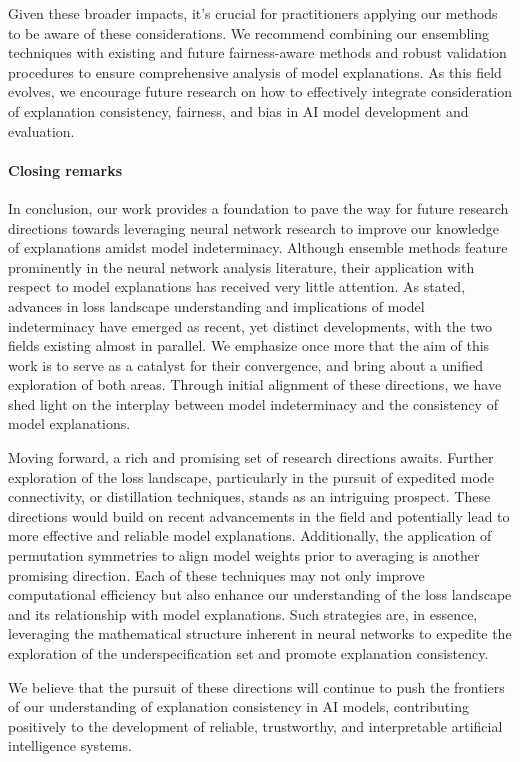 Given these broader impacts, it's crucial for practitioners applying our methods to be aware of these considerations. We recommend combining our ensembling techniques with existing and future fairness-aware methods and robust validation procedures to ensure comprehensive analysis of model explanations. As this field evolves, we encourage future research on how to effectively integrate consideration of explanation consistency, fairness, and bias in AI model development and evaluation.

\paragraph{Closing remarks} In conclusion, our work provides a foundation to pave the way for future research directions towards leveraging neural network research to improve our knowledge of explanations amidst model indeterminacy. Although ensemble methods feature prominently in the neural network analysis literature, their application with respect to model explanations has received very little attention. As stated, advances in loss landscape understanding and implications of model indeterminacy have emerged as recent, yet distinct developments, with the two fields existing almost in parallel. We emphasize once more that the aim of this work is to serve as a catalyst for their convergence, and bring about a unified exploration of both areas. Through initial alignment of these directions, we have shed light on the interplay between model indeterminacy and the consistency of model explanations.

Moving forward, a rich and promising set of research directions awaits. Further exploration of the loss landscape, particularly in the pursuit of expedited mode connectivity, or distillation techniques, stands as an intriguing prospect. These directions would build on recent advancements in the field and potentially lead to more effective and reliable model explanations. Additionally, the application of permutation symmetries to align model weights prior to averaging is another promising direction. Each of these techniques may not only improve computational efficiency but also enhance our understanding of the loss landscape and its relationship with model explanations. Such strategies are, in essence, leveraging the mathematical structure inherent in neural networks to expedite the exploration of the underspecification set and promote explanation consistency.

We believe that the pursuit of these directions will continue to push the frontiers of our understanding of explanation consistency in AI models, contributing positively to the development of reliable, trustworthy, and interpretable artificial intelligence systems.